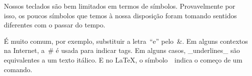 \documentclass{article}
\begin{document}
Nossos teclados são bem limitados em termos de símbolos. Provavelmente por
isso, os poucos símbolos que temos à nossa disposição foram tomando sentidos
diferentes com o passar do tempo.

É muito comum, por exemplo, substituir a letra~“e” pelo~&. Em alguns contextos
na Internet, a~# é usada para indicar tags. Em alguns casos, _underlines_ são
equivalentes a um texto itálico. E no \LaTeX, o símbolo~\ indica o começo de um
comando.
\end{document}
